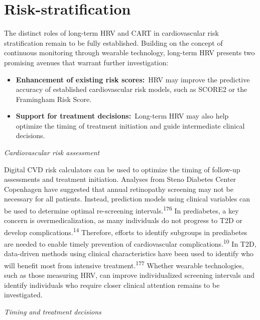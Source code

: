 \documentclass[
  a4paper,
  headsepline=true,
  open=left]{scrbook}
\begin{document}
\hypertarget{risk-stratification-1}{%
\section{Risk-stratification}\label{risk-stratification-1}}

The distinct roles of long-term HRV and CART in cardiovascular risk
stratification remain to be fully established. Building on the concept
of continuous monitoring through wearable technology, long-term HRV
presents two promising avenues that warrant further investigation:

\begin{itemize}
\item
  \textbf{Enhancement of existing risk scores:}~HRV may improve the
  predictive accuracy of established cardiovascular risk models, such as
  SCORE2 or the Framingham Risk Score.
\item
  \textbf{Support for treatment decisions:}~Long-term HRV may also help
  optimize the timing of treatment initiation and guide intermediate
  clinical decisions.
\end{itemize}

\emph{Cardiovascular risk assessment}

Digital CVD risk calculators can be used to optimize the timing of
follow-up assessments and treatment initiation. Analyses from Steno
Diabetes Center Copenhagen have suggested that annual retinopathy
screening may not be necessary for all patients. Instead, prediction
models using clinical variables can be used to determine optimal
re-screening intervals.\textsuperscript{176} In prediabetes, a key
concern is overmedicalization, as many individuals do not progress to
T2D or develop complications.\textsuperscript{14} Therefore, efforts to
identify subgroups in prediabetes are needed to enable timely prevention
of cardiovascular complications.\textsuperscript{10} In T2D, data-driven
methods using clinical characteristics have been used to identify who
will benefit most from intensive treatment.\textsuperscript{177} Whether
wearable technologies, such as those measuring HRV, can improve
individualized screening intervals and identify individuals who require
closer clinical attention remains to be investigated.

\emph{Timing and treatment decisions}
\end{document}
